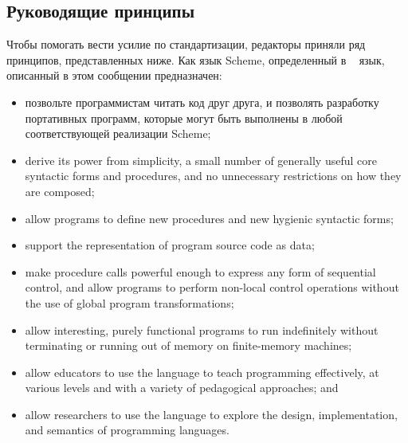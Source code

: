 \subsection*{Руководящие принципы}

Чтобы помогать вести усилие по стандартизации, редакторы приняли ряд принципов, представленных
ниже. Как язык Scheme, определенный в ~\cite{R5RS}
язык, описанный в этом сообщении предназначен:

\begin{itemize}
\item позвольте программистам читать код друг друга, и позволять разработку портативных
  программ, которые могут быть выполнены в любой соответствующей реализации Scheme;

\item derive its power from simplicity, a small number of generally
  useful core syntactic forms and procedures, and no unnecessary
  restrictions on how they are composed;

\item allow programs to define new procedures and new hygienic
  syntactic forms;

\item support the representation of program source code as data;

\item make procedure calls powerful enough to express any form of
  sequential control, and allow programs to perform non-local control
  operations without the use of global program transformations;

\item allow interesting, purely functional programs to run indefinitely
  without terminating or running out of memory on finite-memory
  machines;

\item allow educators to use the language to teach programming
  effectively, at various levels and with a variety of pedagogical
  approaches; and

\item allow researchers to use the language to explore the design,
  implementation, and semantics of programming languages.
\end{itemize}

